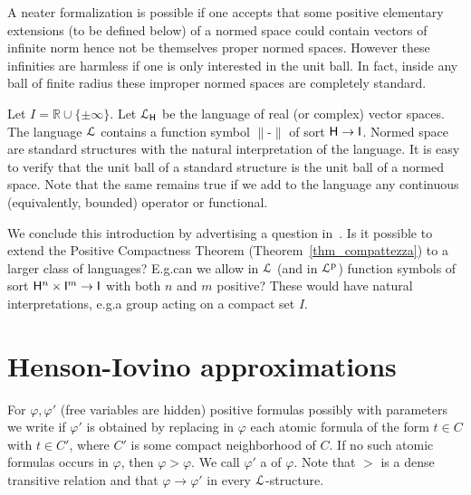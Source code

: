 \documentclass[10pt,oneside]{amsproc}
\renewcommand*{\emph}[1]{%
   \smash{\tikz[baseline]\node[rectangle, fill=teal!25, rounded corners, inner xsep=0.5ex, inner ysep=0.2ex, anchor=base, minimum height = 2.7ex]{\strut #1};}}
\begin{document}
A neater formalization is possible if one accepts that some positive elementary extensions (to be defined below) of a normed space could contain vectors of infinite norm hence not be themselves proper normed spaces.
However these infinities are harmless if one is only interested in the unit ball.
In fact, inside any ball of finite radius these improper normed spaces are completely standard.

\begin{example}\label{ex_normed_spaces}
Let $I=\mathds{R}\cup\{\pm\infty\}$.
Let ${\EuScript L}_{\sf H}$ be the language of real (or complex) vector spaces.
The language ${\EuScript L}$ contains a function symbol $\|\mbox{-}\|$ of sort ${\sf H}\to {\sf I}$.
Normed space are standard structures with the natural interpretation of the language.
It is easy to verify that the unit ball of a standard structure is the unit ball of a normed space.
Note that the same remains true if we add to the language any continuous (equivalently, bounded) operator or functional.
\end{example}

We conclude this introduction by advertising a question in~\cite{clcl}.
Is it possible to extend the Positive Compactness Theorem (Theorem~\ref{thm_compattezza}) to a larger class of languages?
E.g.\@ can we allow in ${\EuScript L}$ (and in ${\EuScript L}^{\rm p}$) function symbols of sort ${\sf H}^n\times {\sf I}^m\to {\sf I}$ with both $n$ and $m$ positive?
These would have natural interpretations, e.g.\@ a group acting on a compact set $I$.

\section{Henson-Iovino approximations}\label{ultrapws}

For $\varphi,\varphi'$ (free variables are hidden) positive formulas possibly with parameters we write \emph{$\varphi'>\varphi$\/} if $\varphi'$ is obtained by replacing in $\varphi$ each atomic formula of the form $t\in C$ with $t\in C'$, where $C'$ is some compact neighborhood of $C$.
If no such atomic formulas occurs in $\varphi$, then $\varphi>\varphi$.
We call $\varphi'$ a \emph{weakening\/} of $\varphi$.
Note that $>$ is a dense transitive relation and that  $\varphi\to\varphi'$ in every ${\EuScript L}$-structure.
\end{document}
